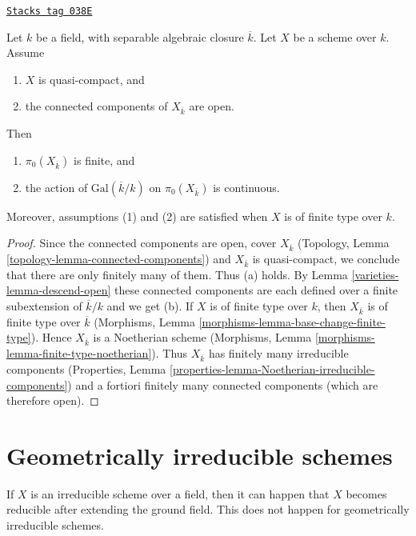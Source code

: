 \begin{lemma}
\label{varieties-lemma-galois-action-connected-components-continuous}
\href{https://stacks.math.columbia.edu/tag/038E}{\texttt{Stacks tag 038E}}

Let $k$ be a field, with separable algebraic closure $\overline{k}$.
Let $X$ be a scheme over $k$.
Assume
\begin{enumerate}
\item $X$ is quasi-compact, and
\item the connected components of $X_{\overline{k}}$ are open.
\end{enumerate}
Then
\begin{enumerate}
\item[(a)] $\pi_0(X_{\overline{k}})$ is finite, and
\item[(b)] the action of $\text{Gal}(\overline{k}/k)$ on
$\pi_0(X_{\overline{k}})$ is continuous.
\end{enumerate}
Moreover, assumptions (1) and (2) are satisfied when $X$ is
of finite type over $k$.
\end{lemma}

\begin{proof}

Since the connected components are open, cover $X_{\overline{k}}$
(Topology, Lemma \ref{topology-lemma-connected-components}) and
$X_{\overline{k}}$ is quasi-compact, we conclude that there are only
finitely many of them. Thus (a) holds.
By Lemma \ref{varieties-lemma-descend-open} these connected components
are each defined over a finite subextension of $\overline{k}/k$
and we get (b).
If $X$ is of finite type over $k$, then $X_{\overline{k}}$ is of finite
type over $\overline{k}$
(Morphisms, Lemma \ref{morphisms-lemma-base-change-finite-type}).
Hence $X_{\overline{k}}$ is a Noetherian scheme
(Morphisms, Lemma \ref{morphisms-lemma-finite-type-noetherian}).
Thus $X_{\overline{k}}$ has finitely many irreducible components
(Properties, Lemma \ref{properties-lemma-Noetherian-irreducible-components})
and a fortiori finitely many connected components (which are
therefore open).
\end{proof}

\section{Geometrically irreducible schemes}
\label{varieties-section-geometrically-irreducible}
If $X$ is an irreducible scheme over a field, then it can happen that $X$
becomes reducible after extending the ground field. This does not happen
for geometrically irreducible schemes.

